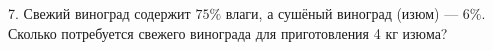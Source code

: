 7. Свежий виноград содержит $75\%$ влаги, а сушёный виноград (изюм) --- $6\%.$
Сколько потребуется свежего винограда для приготовления 4 кг изюма?\\
